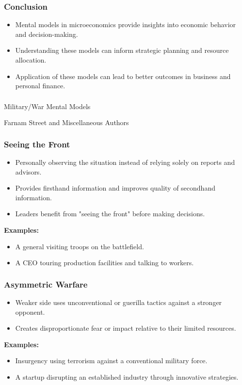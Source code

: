 \begin{frame}[fragile]\frametitle{Conclusion}
\begin{itemize}
    \item Mental models in microeconomics provide insights into economic behavior and decision-making.
    \item Understanding these models can inform strategic planning and resource allocation.
    \item Application of these models can lead to better outcomes in business and personal finance.
\end{itemize}
\end{frame}


\begin{frame}[fragile]\frametitle{}
\begin{center}
{\Large Military/War Mental Models}

{\tiny Farnam Street and Miscellaneous Authors }


\end{center}
\end{frame}

\begin{frame}[fragile]\frametitle{Seeing the Front}
\begin{itemize}
    \item Personally observing the situation instead of relying solely on reports and advisors.
    \item Provides firsthand information and improves quality of secondhand information.
    \item Leaders benefit from "seeing the front" before making decisions.
\end{itemize}
\textbf{Examples:}
\begin{itemize}
    \item A general visiting troops on the battlefield.
    \item A CEO touring production facilities and talking to workers.
\end{itemize}
\end{frame}

\begin{frame}[fragile]\frametitle{Asymmetric Warfare}
\begin{itemize}
    \item Weaker side uses unconventional or guerilla tactics against a stronger opponent.
    \item Creates disproportionate fear or impact relative to their limited resources.
\end{itemize}
\textbf{Examples:}
\begin{itemize}
    \item Insurgency using terrorism against a conventional military force.
    \item A startup disrupting an established industry through innovative strategies.
\end{itemize}
\end{frame}

